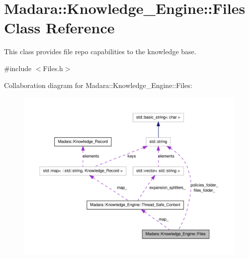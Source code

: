 \hypertarget{classMadara_1_1Knowledge__Engine_1_1Files}{
\section{Madara::Knowledge\_\-Engine::Files Class Reference}
\label{d1/dfe/classMadara_1_1Knowledge__Engine_1_1Files}
}


This class provides file repo capabilities to the knowledge base.  




{\ttfamily \#include $<$Files.h$>$}



Collaboration diagram for Madara::Knowledge\_\-Engine::Files:
\nopagebreak
\begin{figure}[H]
\begin{center}
\leavevmode
\includegraphics[width=400pt]{d5/dc3/classMadara_1_1Knowledge__Engine_1_1Files__coll__graph}
\end{center}
\end{figure}
